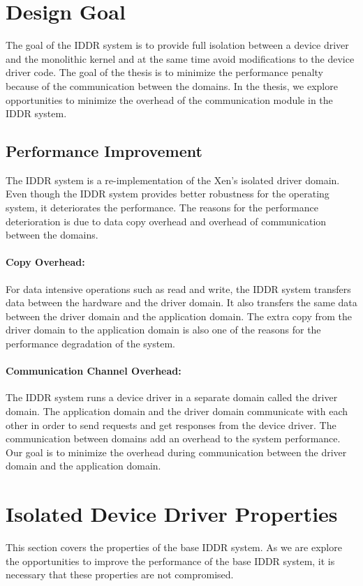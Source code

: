\section{Design Goal}\label{sec:goals}
The goal of the IDDR system is to provide full isolation between a device driver and the monolithic kernel and at the same time avoid modifications to the device driver code. The goal of the thesis is to minimize the performance penalty because of the communication between the domains. In the thesis, we explore opportunities to minimize the overhead of the communication module in the IDDR system.

\subsection*{Performance Improvement}
The IDDR system is a re-implementation of the Xen's isolated driver domain. Even though the IDDR system provides better robustness for the operating system, it deteriorates the performance. The reasons for the performance deterioration is due to data copy overhead and overhead of communication between the domains. 

\paragraph{Copy Overhead: } For data intensive operations such as read and write, the IDDR system transfers data between the hardware and the driver domain. It also transfers the same data between the driver domain and the application domain. The extra copy from the driver domain to the application domain is also one of the reasons for the performance degradation of the system. 

\paragraph{Communication Channel Overhead: } The IDDR system runs a device driver in a separate domain called the driver domain. The application domain and the driver domain communicate with each other in order to send requests and get responses from the device driver. The communication between domains add an overhead to the system performance. Our goal is to minimize the overhead during communication between the driver domain and the application domain.

\section{Isolated Device Driver Properties}
\label{sec:properties}
This section covers the properties of the base IDDR system. As we are explore the opportunities to improve the performance of the base IDDR system, it is necessary that these properties are not compromised.

